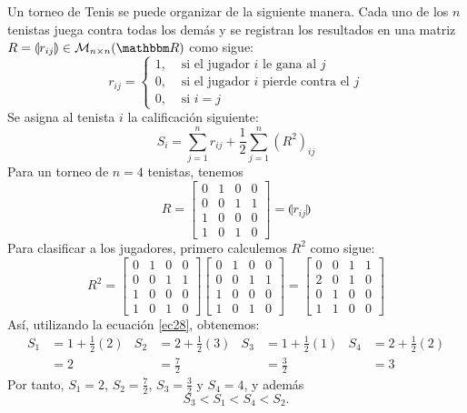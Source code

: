 \begin{example}
    Un torneo de Tenis se puede organizar de la siguiente manera. Cada uno de los $n$ tenistas juega contra todas los demás y se registran los resultados en una matriz $R = \llparenthesis r_{ij} \rrparenthesis \in \mathcal{M}_{n \times n}(\RR)$ como sigue:
    $$r_{ij} = \begin{cases}
        1, & \text{ si el jugador $i$ le gana al $j$} \\
        0, & \text{ si el jugador $i$ pierde contra el $j$} \\
        0, & \text{ si $i = j$}
    \end{cases}$$
    Se asigna al tenista $i$ la calificación siguiente:
    \begin{equation}
        S_i = \sum_{j=1}^{n} r_{ij} + \frac{1}{2} \sum_{j=1}^{n} \left( R^{2} \right)_{ij} \label{ec28}
    \end{equation}
    Para un torneo de $n = 4$ tenistas, tenemos
    $$R = \begin{bmatrix}
        0 & 1 & 0 & 0 \\
        0 & 0 & 1 & 1 \\
        1 & 0 & 0 & 0 \\
        1 & 0 & 1 & 0
    \end{bmatrix} = \llparenthesis r_{ij} \rrparenthesis$$
    Para clasificar a los jugadores, primero calculemos $R^{2}$ como sigue:
    $$R^{2} = \begin{bmatrix}
        0 & 1 & 0 & 0 \\
        0 & 0 & 1 & 1 \\
        1 & 0 & 0 & 0 \\
        1 & 0 & 1 & 0
    \end{bmatrix} \begin{bmatrix}
        0 & 1 & 0 & 0 \\
        0 & 0 & 1 & 1 \\
        1 & 0 & 0 & 0 \\
        1 & 0 & 1 & 0
    \end{bmatrix} = \begin{bmatrix}
        0 & 0 & 1 & 1 \\
        2 & 0 & 1 & 0 \\
        0 & 1 & 0 & 0 \\
        1 & 1 & 0 & 0
    \end{bmatrix}$$
    Así, utilizando la ecuación \eqref{ec28}, obtenemos:
    \begin{align*}
        S_1 & = 1 + \frac{1}{2} (2) & S_2 & = 2 + \frac{1}{2} (3) & S_3 & = 1 + \frac{1}{2} (1) & S_4 & = 2 + \frac{1}{2} (2) \\
        & = 2 & & = \frac{7}{2} & & = \frac{3}{2} & & = 3
    \end{align*}
    Por tanto, $S_1 = 2$, $\displaystyle S_2 = \frac{7}{2}$, $\displaystyle S_3 = \frac{3}{2}$ y $S_4 = 4$, y además
    $$S_3 < S_1 < S_4 < S_2.$$
\end{example}


